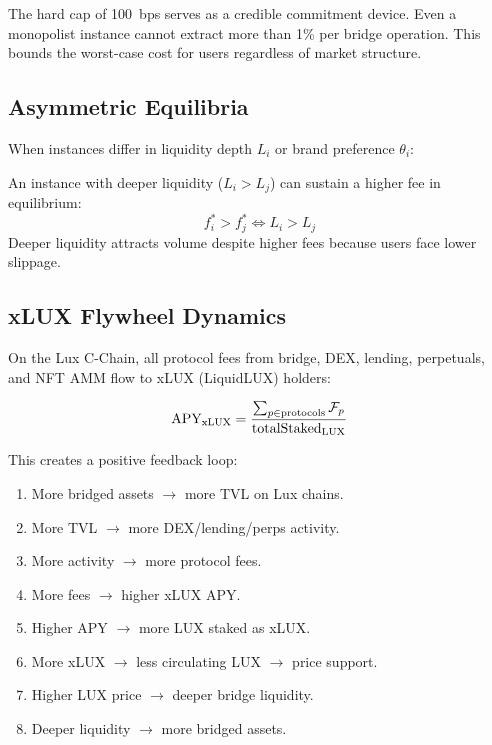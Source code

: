 \begin{remark}
The hard cap of 100~bps serves as a credible commitment device. Even a monopolist instance cannot extract more than 1\% per bridge operation. This bounds the worst-case cost for users regardless of market structure.
\end{remark}

\subsection{Asymmetric Equilibria}

When instances differ in liquidity depth $L_i$ or brand preference $\theta_i$:

\begin{proposition}
\label{prop:liquidity}
An instance with deeper liquidity ($L_i > L_j$) can sustain a higher fee in equilibrium:
\begin{equation}
  f_i^* > f_j^* \iff L_i > L_j
\end{equation}
Deeper liquidity attracts volume despite higher fees because users face lower slippage.
\end{proposition}

\subsection{xLUX Flywheel Dynamics}

On the Lux C-Chain, all protocol fees from bridge, DEX, lending, perpetuals, and NFT AMM flow to xLUX (LiquidLUX) holders:

\begin{equation}
  \text{APY}_{\text{xLUX}} = \frac{\sum_{p \in \text{protocols}} \mathcal{F}_p}{\text{totalStaked}_{\text{LUX}}}
\end{equation}

This creates a positive feedback loop:

\begin{enumerate}[nosep]
  \item More bridged assets $\to$ more TVL on Lux chains.
  \item More TVL $\to$ more DEX/lending/perps activity.
  \item More activity $\to$ more protocol fees.
  \item More fees $\to$ higher xLUX APY.
  \item Higher APY $\to$ more LUX staked as xLUX.
  \item More xLUX $\to$ less circulating LUX $\to$ price support.
  \item Higher LUX price $\to$ deeper bridge liquidity.
  \item Deeper liquidity $\to$ more bridged assets.
\end{enumerate}

